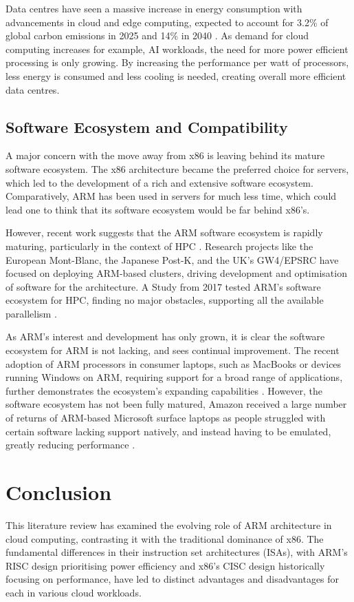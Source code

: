 \documentclass[conference]{IEEEtran}  %
\begin{document}
Data centres have seen a massive increase in energy consumption with advancements in cloud and edge computing, expected to account for 3.2\% of global carbon emissions in 2025 and 14\% in 2040 \cite{datacentreEnergy}. 
As demand for cloud computing increases for example, AI workloads, the need for more power efficient processing is only growing.
By increasing the performance per watt of processors, less energy is consumed and less cooling is needed, creating overall more efficient data centres.

\subsection{Software Ecosystem and Compatibility}
A major concern with the move away from x86 is leaving behind its mature software ecosystem.
The x86 architecture became the preferred choice for servers, which led to the development of a rich and extensive software ecosystem. 
Comparatively, ARM has been used in servers for much less time, which could lead one to think that its software ecosystem would be far behind x86's.

However, recent work suggests that the ARM software ecosystem is rapidly maturing, particularly in the context of HPC \cite{armEco}.
Research projects like the European Mont-Blanc, the Japanese Post-K, and the UK's GW4/EPSRC have focused on deploying ARM-based clusters, driving development and optimisation of software for the architecture. 
A Study from 2017 tested ARM's software ecosystem for HPC, finding no major obstacles, supporting all the available parallelism \cite{armEco}.

As ARM's interest and development has only grown, it is clear the software ecosystem for ARM is not lacking, and sees continual improvement. The recent adoption of ARM processors in consumer laptops, such as MacBooks or devices running Windows on ARM, requiring support for a broad range of applications, further demonstrates the ecosystem's expanding capabilities \cite{armLaptop}.
However, the software ecosystem has not been fully matured, Amazon received a large number of returns of ARM-based Microsoft surface laptops as people struggled with certain software lacking support natively, and instead having to be emulated, greatly reducing performance \cite{windowsOnArmWoes}.



\section{Conclusion} %
This literature review has examined the evolving role of ARM architecture in cloud computing, contrasting it with the traditional dominance of x86. The fundamental differences in their instruction set architectures (ISAs), with ARM's RISC design prioritising power efficiency and x86's CISC design historically focusing on performance, have led to distinct advantages and disadvantages for each in various cloud workloads.\cite{ARM_RISC_vs_x86_CISC} \cite{instructions_CISC_vs_RISC}
\end{document}
